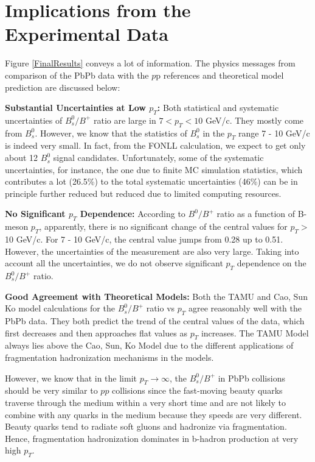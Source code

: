 \section{Implications from the Experimental Data}

Figure \ref{FinalResults} conveys a lot of information. The physics messages from comparison of the PbPb data with the $p$p references and theoretical model prediction are discussed below:



\textbf{Substantial Uncertainties at Low $p_T$:} Both statistical and systematic uncertainties of $B^0_s/B^+$ ratio are large in $7 < p_T < 10$ GeV/c. They mostly come from $B^0_s$. However, we know that the statistics of $B^0_s$ in the $p_T$ range 7 - 10 GeV/c is indeed very small. In fact, from the FONLL calculation, we expect to get only about 12 $B^0_s$ signal candidates. Unfortunately, some of the systematic uncertainties, for instance, the one due to finite MC simulation statistics, which contributes a lot (26.5\%) to the total systematic uncertainties (46\%) can be in principle further reduced but reduced due to limited computing resources. 

\textbf{No Significant $p_T$ Dependence:} According to $B^0/B^+$ ratio as a function of B-meson $p_T$, apparently, there is no significant change of the central values for $p_T >$10 GeV/c. For 7 - 10 GeV/c, the central value jumps from 0.28 up to 0.51. However, the uncertainties of the measurement are also very large. Taking into account all the uncertainties, we do not observe significant $p_T$ dependence on the $B^0_s/B^+$ ratio.

\textbf{Good Agreement with Theoretical Models:} Both the TAMU and Cao, Sun Ko model calculations for the $B^0_s/B^+$ ratio vs $p_T$ agree reasonably well with the PbPb data. They both predict the trend of the central values of the data, which first decreases and then approaches flat values as $p_T$ increases. The TAMU Model always lies above the Cao, Sun, Ko Model due to the different applications of fragmentation hadronization mechanisms in the models.

However, we know that in the limit $p_T \rightarrow \infty$, the $B^0_s/B^+$ in PbPb collisions should be very similar to $pp$ collisions since the fast-moving beauty quarks traverse through the medium within a very short time and are not likely to combine with any quarks in the medium because they speeds are very different. Beauty quarks tend to radiate soft gluons and hadronize via fragmentation. Hence, fragmentation hadronization dominates in b-hadron production at very high $p_T$. 

